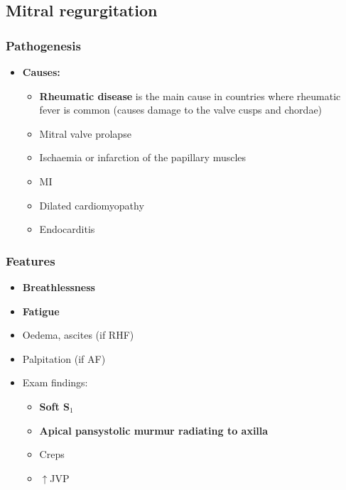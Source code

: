 \documentclass[
  12pt,
]{memoir}
\providecommand{\tightlist}{%
  \setlength{\itemsep}{0pt}\setlength{\parskip}{0pt}}
\begin{document}
\hypertarget{mitral-regurgitation}{%
\subsection{Mitral regurgitation}\label{mitral-regurgitation}}

\hypertarget{pathogenesis-6}{%
\subsubsection{Pathogenesis}\label{pathogenesis-6}}

\begin{itemize}
\tightlist
\item
  \textbf{Causes:}

  \begin{itemize}
  \tightlist
  \item
    \textbf{Rheumatic disease} is the main cause in countries where
    rheumatic fever is common (causes damage to the valve cusps and
    chordae)
  \item
    Mitral valve prolapse
  \item
    Ischaemia or infarction of the papillary muscles
  \item
    MI
  \item
    Dilated cardiomyopathy
  \item
    Endocarditis
  \end{itemize}
\end{itemize}

\hypertarget{features-8}{%
\subsubsection{Features}\label{features-8}}

\begin{itemize}
\tightlist
\item
  \textbf{Breathlessness}
\item
  \textbf{Fatigue}
\item
  Oedema, ascites (if RHF)
\item
  Palpitation (if AF)
\item
  Exam findings:

  \begin{itemize}
  \tightlist
  \item
    \textbf{Soft S\(_1\)}
  \item
    \textbf{Apical pansystolic murmur radiating to axilla}
  \item
    Creps
  \item
    \(\uparrow\)JVP
  \end{itemize}
\end{itemize}
\end{document}
